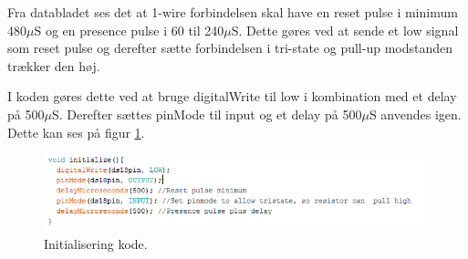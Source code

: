 Fra databladet ses det at 1-wire forbindelsen skal have en reset pulse i minimum 480$\mu$S og en presence pulse i 60 til 240$\mu$S. Dette gøres ved at sende et low signal som reset pulse og derefter sætte forbindelsen i tri-state og pull-up modstanden trækker den høj. 

I koden gøres dette ved at bruge digitalWrite til low i kombination med et delay på 500$\mu$S. Derefter sættes pinMode til input og et delay på 500$\mu$S anvendes igen. Dette kan ses på figur \ref{sensor_kode}.

\begin{figure}[h!]
  \centering
  \includegraphics[width=1\textwidth]{figures/Init.png}
  \caption{Initialisering kode.}
  \label{sensor_kode}
\end{figure}